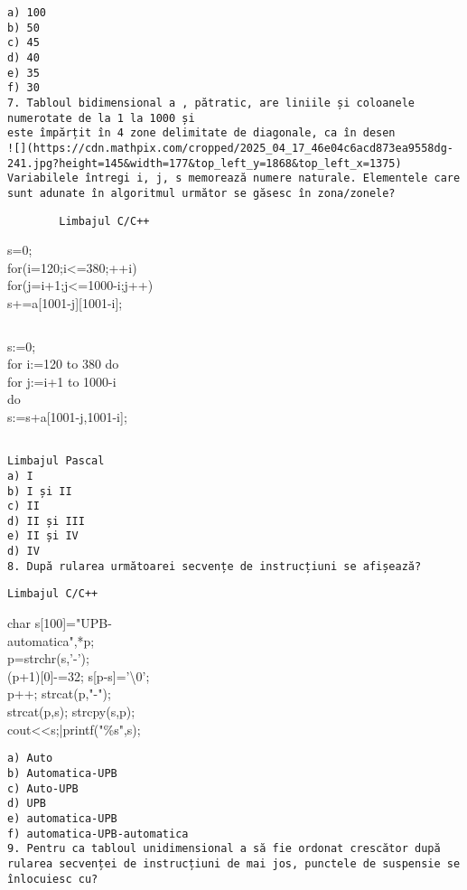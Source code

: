 \begin{verbatim}
a) 100
b) 50
c) 45
d) 40
e) 35
f) 30
7. Tabloul bidimensional a , pătratic, are liniile și coloanele numerotate de la 1 la 1000 și
este împărțit în 4 zone delimitate de diagonale, ca în desen
![](https://cdn.mathpix.com/cropped/2025_04_17_46e04c6acd873ea9558dg-241.jpg?height=145&width=177&top_left_y=1868&top_left_x=1375) Variabilele întregi i, j, s memorează numere naturale. Elementele care sunt adunate în algoritmul următor se găsesc în zona/zonele?
\end{verbatim}

\begin{verbatim}
        Limbajul C/C++
\end{verbatim}

s=0;\\
for(i=120;i<=380;++i)\\
for(j=i+1;j<=1000-i;j++)\\[0pt]
s+=a[1001-j][1001-i];

\begin{verbatim}

\end{verbatim}

s:=0;\\
for i:=120 to 380 do\\
for j:=i+1 to 1000-i\\
do\\[0pt]
s:=s+a[1001-j,1001-i];

\begin{verbatim}

Limbajul Pascal
a) I
b) I și II
c) II
d) II și III
e) II și IV
d) IV
8. După rularea următoarei secvențe de instrucțiuni se afișează?
\end{verbatim}

\begin{verbatim}
Limbajul C/C++
\end{verbatim}

char s[100]="UPB-\\
automatica",*p;\\
p=strchr(s,'-');\\[0pt]
(p+1)[0]-=32; s[p-s]='\textbackslash 0';\\
p++; strcat(p,"-");\\
strcat(p,s); strcpy(s,p);\\
cout<<s;|printf("\%s",s);

\begin{verbatim}
a) Auto
b) Automatica-UPB
c) Auto-UPB
d) UPB
e) automatica-UPB
f) automatica-UPB-automatica
9. Pentru ca tabloul unidimensional a să fie ordonat crescător după rularea secvenței de instrucțiuni de mai jos, punctele de suspensie se înlocuiesc cu?
\end{verbatim}

